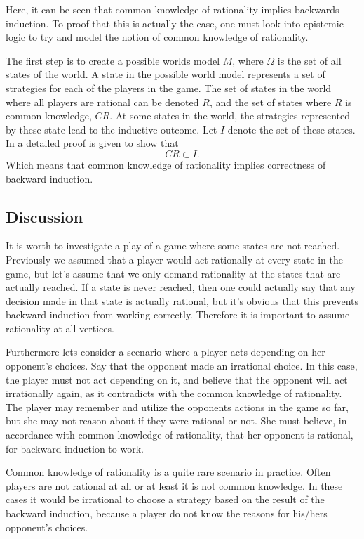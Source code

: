 Here, it can be seen that common knowledge of rationality implies backwards induction. To proof that this is actually the case, one must look into epistemic logic to try and model the notion of common knowledge of rationality. 

The first step is to create a possible worlds model $M$, where $\Omega$ is the set of all states of the world. A state in the possible world model represents a set of strategies for each of the players in the game.
The set of states in the world where all players are rational can be denoted $R$, and the set of states where $R$ is common knowledge, $CR$. At some states in the world, the strategies represented by these state lead to the inductive outcome. Let $I$ denote the set of these states.
In \cite{aumann1995a} a detailed proof is given to show that
$$
CR \subset I.
$$
Which means that common knowledge of rationality implies correctness of backward induction.

\subsection{Discussion}
It is worth to investigate a play of a game where some states are not reached. Previously we assumed that a player would act rationally at every state in the game, but let's assume that we only demand rationality at the states that are actually reached.
If a state is never reached, then one could actually say that any decision made in that state is actually rational, but it's obvious that this prevents backward induction from working correctly. Therefore it is important to assume rationality at all vertices.

Furthermore lets consider a scenario where a player acts depending on her opponent's choices. Say that the opponent made an irrational choice. In this case, the player must not act depending on it, and believe that the opponent will act irrationally again, as it contradicts with the common knowledge of rationality. The player may remember and utilize the opponents actions in the game so far, but she may not reason about if they were rational or not. She must believe, in accordance with common knowledge of rationality, that her opponent is rational, for backward induction to work.

Common knowledge of rationality is a quite rare scenario in practice. Often players are not rational at all or at least it is not common knowledge. In these cases it would be irrational to choose a strategy based on the result of the backward induction, because a player do not know the reasons for his/hers opponent's choices.